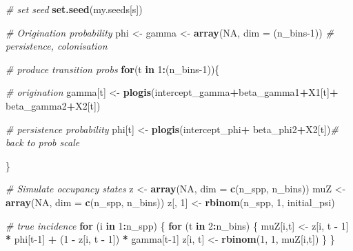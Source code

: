 \documentclass[
]{article}
\newenvironment{Shaded}{\begin{snugshade}}{\end{snugshade}}
\newcommand{\AttributeTok}[1]{\textcolor[rgb]{0.13,0.29,0.53}{#1}}
\newcommand{\CommentTok}[1]{\textcolor[rgb]{0.56,0.35,0.01}{\textit{#1}}}
\newcommand{\ConstantTok}[1]{\textcolor[rgb]{0.56,0.35,0.01}{#1}}
\newcommand{\ControlFlowTok}[1]{\textcolor[rgb]{0.13,0.29,0.53}{\textbf{#1}}}
\newcommand{\DecValTok}[1]{\textcolor[rgb]{0.00,0.00,0.81}{#1}}
\newcommand{\FunctionTok}[1]{\textcolor[rgb]{0.13,0.29,0.53}{\textbf{#1}}}
\newcommand{\NormalTok}[1]{#1}
\newcommand{\OtherTok}[1]{\textcolor[rgb]{0.56,0.35,0.01}{#1}}
\newcommand{\SpecialCharTok}[1]{\textcolor[rgb]{0.81,0.36,0.00}{\textbf{#1}}}
\begin{document}
{\begin{Shaded}
\begin{Highlighting}[]
        \CommentTok{\# set seed}
        \FunctionTok{set.seed}\NormalTok{(my.seeds[s])}
        
        \CommentTok{\# Origination probability}
\NormalTok{        phi }\OtherTok{\textless{}{-}}\NormalTok{ gamma }\OtherTok{\textless{}{-}} \FunctionTok{array}\NormalTok{(}\ConstantTok{NA}\NormalTok{, }\AttributeTok{dim =}\NormalTok{ (n\_bins}\DecValTok{{-}1}\NormalTok{)) }\CommentTok{\# persistence, colonisation}
         
        \CommentTok{\# produce transition probs}
        \ControlFlowTok{for}\NormalTok{(t }\ControlFlowTok{in} \DecValTok{1}\SpecialCharTok{:}\NormalTok{(n\_bins}\DecValTok{{-}1}\NormalTok{))\{}
          
            \CommentTok{\# origination }
\NormalTok{            gamma[t] }\OtherTok{\textless{}{-}} \FunctionTok{plogis}\NormalTok{(intercept\_gamma}\SpecialCharTok{+}\NormalTok{beta\_gamma1}\SpecialCharTok{+}\NormalTok{X1[t]}\SpecialCharTok{+}
\NormalTok{                               beta\_gamma2}\SpecialCharTok{+}\NormalTok{X2[t])}
            
            \CommentTok{\# persistence probability}
\NormalTok{            phi[t] }\OtherTok{\textless{}{-}} \FunctionTok{plogis}\NormalTok{(intercept\_phi}\SpecialCharTok{+}
\NormalTok{                             beta\_phi2}\SpecialCharTok{+}\NormalTok{X2[t])}\CommentTok{\# back to prob scale}
            
            
\NormalTok{        \}}
        
        \CommentTok{\# Simulate occupancy states}
\NormalTok{        z }\OtherTok{\textless{}{-}} \FunctionTok{array}\NormalTok{(}\ConstantTok{NA}\NormalTok{, }\AttributeTok{dim =} \FunctionTok{c}\NormalTok{(n\_spp, n\_bins))}
\NormalTok{        muZ }\OtherTok{\textless{}{-}} \FunctionTok{array}\NormalTok{(}\ConstantTok{NA}\NormalTok{, }\AttributeTok{dim =} \FunctionTok{c}\NormalTok{(n\_spp, n\_bins))}
\NormalTok{        z[, }\DecValTok{1}\NormalTok{] }\OtherTok{\textless{}{-}} \FunctionTok{rbinom}\NormalTok{(n\_spp, }\DecValTok{1}\NormalTok{, initial\_psi)}
        
        \CommentTok{\# true incidence}
        \ControlFlowTok{for}\NormalTok{ (i }\ControlFlowTok{in} \DecValTok{1}\SpecialCharTok{:}\NormalTok{n\_spp) \{}
            \ControlFlowTok{for}\NormalTok{ (t }\ControlFlowTok{in} \DecValTok{2}\SpecialCharTok{:}\NormalTok{n\_bins) \{}
\NormalTok{              muZ[i,t] }\OtherTok{\textless{}{-}}\NormalTok{ z[i, t }\SpecialCharTok{{-}} \DecValTok{1}\NormalTok{] }\SpecialCharTok{*}\NormalTok{ phi[t}\DecValTok{{-}1}\NormalTok{] }\SpecialCharTok{+}\NormalTok{ (}\DecValTok{1} \SpecialCharTok{{-}}\NormalTok{ z[i, t }\SpecialCharTok{{-}} \DecValTok{1}\NormalTok{]) }\SpecialCharTok{*}\NormalTok{ gamma[t}\DecValTok{{-}1}\NormalTok{]}
\NormalTok{              z[i, t] }\OtherTok{\textless{}{-}} \FunctionTok{rbinom}\NormalTok{(}\DecValTok{1}\NormalTok{, }\DecValTok{1}\NormalTok{, muZ[i,t])}
\NormalTok{          \}}
\NormalTok{        \}}
        

\end{Highlighting}
\end{Shaded}}
\end{document}
